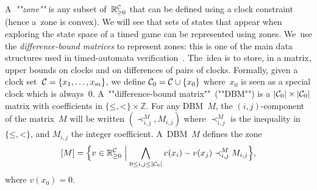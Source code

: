 A~\emph{""zone""} is any subset of~$\mathbb{R}_{\geq 0}^{\mathcal{C}}$ that can be defined
using a clock constraint (hence a~zone is convex).  We will see that
sets of states that appear when exploring the state space of a timed
game can be represented using zones.  We~use the
\emph{difference-bound matrices} to represent zones:
this is one of the main data structures used in timed-automata
verification~\cite{Dil90,BM83}. The~idea is to store, in a matrix,
upper bounds on clocks and on differences of pairs of clocks.
Formally, given a clock
set~$\mathcal{C}=\{x_1,\ldots,x_m\}$, we define $\mathcal{C}_0 = \mathcal{C} \cup \{x_0\}$
where~$x_0$ is seen as a
special clock which is always~$0$.
A~""difference-bound matrix""~(""DBM"") is a $|\mathcal{C}_0|\times |\mathcal{C}_0|$
matrix with coefficients in $\{\mathord\leq,\mathord<\} \times
\mathbb{Z}$.  For any DBM~$M$, the $(i,j)$-component of the matrix~$M$
will be written $(\prec^M_{i,j}, M_{i,j})$ where $\prec^M_{i,j}$ is
the inequality in~$\{\mathord\leq,\mathord<\}$, and $M_{i,j}$ the
integer coefficient. A~DBM~$M$ defines the zone
\[
  [M] = \Bigl\{v\in \mathbb{R}_{\geq 0}^{\mathcal{C}}\Bigm|
  \bigwedge_{0\leq i,j \leq |\mathcal{C}_0|} v(x_i)-v(x_j) \prec^M_{i,j} M_{i,j}\Bigr\},
\]
where $v(x_0) = 0$.

